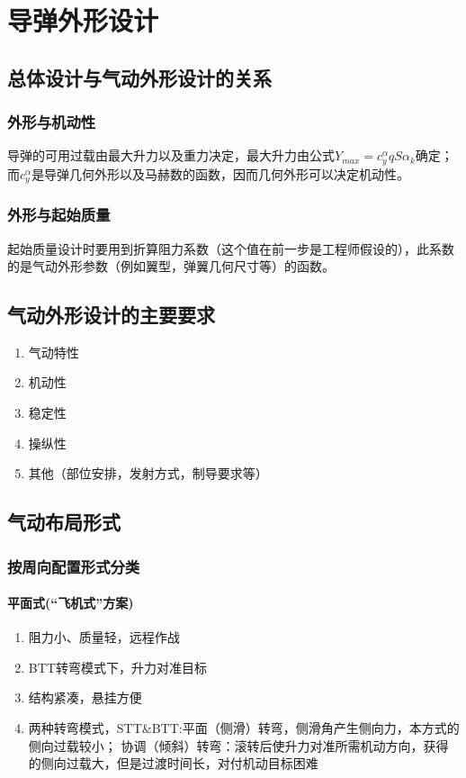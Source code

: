 \chapter{导弹外形设计}
\section{总体设计与气动外形设计的关系}
\subsection{外形与机动性}
导弹的可用过载由最大升力以及重力决定，最大升力由公式$Y_{max}=c_y^{\alpha}qS\alpha_k$确定；
而$c_y^{\alpha}$是导弹几何外形以及马赫数的函数，因而几何外形可以决定机动性。
\subsection{外形与起始质量}
起始质量设计时要用到折算阻力系数（这个值在前一步是工程师假设的），此系数的是气动外形参数（例如翼型，弹翼几何尺寸等）的函数。
\section{气动外形设计的主要要求}
\begin{enumerate}
    \item 气动特性
    \item 机动性
    \item 稳定性
    \item 操纵性
    \item 其他（部位安排，发射方式，制导要求等）
\end{enumerate}
\section{气动布局形式}
\subsection{按周向配置形式分类}
\subsubsection*{平面式(“飞机式”方案)}
\begin{enumerate}
    \item 阻力小、质量轻，远程作战
    \item BTT转弯模式下，升力对准目标
    \item 结构紧凑，悬挂方便
    \item 两种转弯模式，STT\&BTT:{\kaishu 平面（侧滑）转弯，侧滑角产生侧向力，本方式的侧向过载较小；
    协调（倾斜）转弯：滚转后使升力对准所需机动方向，获得的侧向过载大，但是过渡时间长，对付机动目标困难}
\end{enumerate}
